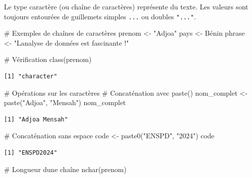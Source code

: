 \documentclass[
  french,
  11pt,
  a4paper,
]{article}
\newenvironment{Shaded}{}{}
\newcommand{\CommentTok}[1]{\textcolor[rgb]{0.42,0.45,0.49}{#1}}
\newcommand{\FunctionTok}[1]{\textcolor[rgb]{0.44,0.26,0.76}{#1}}
\newcommand{\NormalTok}[1]{\textcolor[rgb]{0.14,0.16,0.18}{#1}}
\newcommand{\OtherTok}[1]{\textcolor[rgb]{0.44,0.26,0.76}{#1}}
\newcommand{\StringTok}[1]{\textcolor[rgb]{0.01,0.18,0.38}{#1}}
\begin{document}
Le type caractère (ou chaîne de caractères) représente du texte. Les
valeurs sont toujours entourées de guillemets simples
\texttt{\textquotesingle{}...\textquotesingle{}} ou doubles
\texttt{"..."}.

\begin{Shaded}
\begin{Highlighting}[]
\CommentTok{\# Exemples de chaînes de caractères}
\NormalTok{prenom }\OtherTok{\textless{}{-}} \StringTok{"Adjoa"}
\NormalTok{pays }\OtherTok{\textless{}{-}} \StringTok{\textquotesingle{}Bénin\textquotesingle{}}
\NormalTok{phrase }\OtherTok{\textless{}{-}} \StringTok{"L\textquotesingle{}analyse de données est fascinante !"}

\CommentTok{\# Vérification}
\FunctionTok{class}\NormalTok{(prenom)}
\end{Highlighting}
\end{Shaded}

\begin{verbatim}
[1] "character"
\end{verbatim}

\begin{Shaded}
\begin{Highlighting}[]
\CommentTok{\# Opérations sur les caractères}
\CommentTok{\# Concaténation avec paste()}
\NormalTok{nom\_complet }\OtherTok{\textless{}{-}} \FunctionTok{paste}\NormalTok{(}\StringTok{"Adjoa"}\NormalTok{, }\StringTok{"Mensah"}\NormalTok{)}
\NormalTok{nom\_complet}
\end{Highlighting}
\end{Shaded}

\begin{verbatim}
[1] "Adjoa Mensah"
\end{verbatim}

\begin{Shaded}
\begin{Highlighting}[]
\CommentTok{\# Concaténation sans espace}
\NormalTok{code }\OtherTok{\textless{}{-}} \FunctionTok{paste0}\NormalTok{(}\StringTok{"ENSPD"}\NormalTok{, }\StringTok{"2024"}\NormalTok{)}
\NormalTok{code}
\end{Highlighting}
\end{Shaded}

\begin{verbatim}
[1] "ENSPD2024"
\end{verbatim}

\begin{Shaded}
\begin{Highlighting}[]
\CommentTok{\# Longueur d\textquotesingle{}une chaîne}
\FunctionTok{nchar}\NormalTok{(prenom)}
\end{Highlighting}
\end{Shaded}
\end{document}
